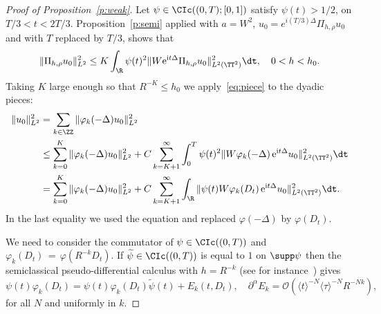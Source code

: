 \begin{proof}[Proof of Proposition~\ref{p:weak}]
Let $\psi \in \CIc ((0, T) ; [0, 1]) $ satisfy $\psi (t) > 1/2$, on $ T/3 < t < 2T / 3 $. Proposition~\ref{p:semi} applied with $ a = W^2 $, $ u_0 = e^{ i (T/3) \Delta } \Pi_{h, \rho } u_0 $ and with $ T $ replaced by $ T/3 $, shows that
\begin{equation}\label{eq:piece}
\|\Pi_{h, \rho } u_0\|_{L^2}^2 \leq K \int_\R \psi(t)^2 \| W \mathrm{e}^{\mathrm{i} t \Delta } \Pi_{h, \rho } u_0\|_{L^2 (\TT^2) }^2 \dt, \quad 0 < h < h_0.
\end{equation}
Taking $K $ large enough so that $R^{-K } \leq h_{0}$ we apply~\eqref{eq:piece} to the dyadic pieces:
\begin{align*}
\|u_0 \|^2_{L^2} & =\sum_{ k \in \ZZ } \|\varphi_{k}(-\Delta)u_0\|_{L^2}^2 \\
&\leq \sum_{k=0}^{K } \|\varphi_{k}(-\Delta)u_0\|_{L^2}^2 +C
\sum_{k=K +1}^\infty \int_{0}^T \psi (t) ^2 \| W \varphi_{k}(-\Delta)\,
\mathrm{e}^{\mathrm{i}t \Delta } u_0\|_{L^2(\TT^2) } ^2 \dt \\
& = \sum_{k=0}^{K } \|\varphi_{k}(-\Delta)u_0\|_{L^2}^2 + C
\sum_{k=K +1}^\infty \int_\R \| \psi (t) W \varphi_{k}(D_t)
\,\mathrm{e}^{\mathrm{i}t \Delta } u_0\|_{L^2(\TT^2) } ^2 \dt.
\end{align*}
In the last equality we used the equation and replaced $ \varphi (-\Delta) $ by $
\varphi (D_t) $.

We need to consider the commutator of $ \psi \in \CIc ((0, T)) $ and $
\varphi_{k} (D_t)\,{=}\,\varphi (R^{-k} D_t) $. If $
\widetilde \psi \in \CIc ((0,T))$ is equal to $ 1 $ on $
\supp \psi$ then the semiclassical pseudo-differential calculus with $ h = R ^{-k}$ (see for instance~\cite[Chapter~4]{EZB}) gives
\begin{equation}\label{eq:wideps}
\psi (t) \varphi_{k} (D_t) = \psi (t) \varphi_{k} (D_t) \widetilde \psi (t) + E _k (t, D_t),\quad
\partial^\alpha E_k = {\mathcal O} (\langle t \rangle^{-N } \langle
\tau \rangle^{-N} R ^{- N k }),
\end{equation}
for all $ N$ and uniformly in $ k $.


\end{proof}
